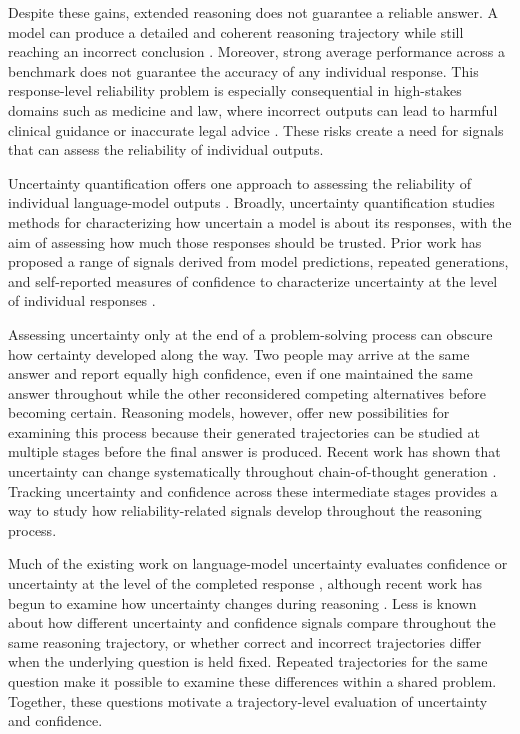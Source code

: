 \documentclass{article}
\begin{document}
Despite these gains, extended reasoning does not guarantee a reliable answer. A model can produce a detailed and coherent reasoning trajectory while still reaching an incorrect conclusion \cite{turpin2023unfaithful}. Moreover, strong average performance across a benchmark does not guarantee the accuracy of any individual response. This response-level reliability problem is especially consequential in high-stakes domains such as medicine and law, where incorrect outputs can lead to harmful clinical guidance or inaccurate legal advice \cite{longwell2024medical,dahl2024legal}. These risks create a need for signals that can assess the reliability of individual outputs.

Uncertainty quantification offers one approach to assessing the reliability of individual language-model outputs \cite{geng2024survey}. Broadly, uncertainty quantification studies methods for characterizing how uncertain a model is about its responses, with the aim of assessing how much those responses should be trusted. Prior work has proposed a range of signals derived from model predictions, repeated generations, and self-reported measures of confidence to characterize uncertainty at the level of individual responses \cite{kuhn2023semantic,tian2023calibration,kadavath2022know}.

Assessing uncertainty only at the end of a problem-solving process can obscure how certainty developed along the way. Two people may arrive at the same answer and report equally high confidence, even if one maintained the same answer throughout while the other reconsidered competing alternatives before becoming certain. Reasoning models, however, offer new possibilities for examining this process because their generated trajectories can be studied at multiple stages before the final answer is produced. Recent work has shown that uncertainty can change systematically throughout chain-of-thought generation \cite{xu2026entropy}. Tracking uncertainty and confidence across these intermediate stages provides a way to study how reliability-related signals develop throughout the reasoning process.

Much of the existing work on language-model uncertainty evaluates confidence or uncertainty at the level of the completed response \cite{geng2024survey}, although recent work has begun to examine how uncertainty changes during reasoning \cite{xu2026entropy}. Less is known about how different uncertainty and confidence signals compare throughout the same reasoning trajectory, or whether correct and incorrect trajectories differ when the underlying question is held fixed. Repeated trajectories for the same question make it possible to examine these differences within a shared problem. Together, these questions motivate a trajectory-level evaluation of uncertainty and confidence.
\end{document}
